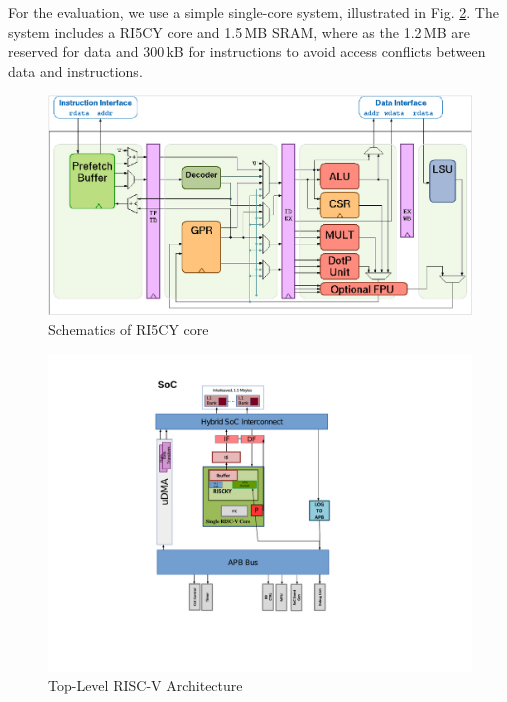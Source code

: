 For the evaluation, we use a simple single-core system, illustrated in Fig. \ref{fig:top-level}. The system includes a RI5CY core and 1.5\,MB SRAM, where as the 1.2\,MB are reserved for data and 300\,kB for instructions to avoid access conflicts between data and instructions.
\begin{figure}
    \centering
    \includegraphics[width=\textwidth]{figures/pipeline.png}
    \caption{Schematics of RI5CY core}
    \label{fig:pipelined}
\end{figure}
\begin{figure}
    \centering
    \includegraphics[trim={2.5cm 3.7cm 8.5cm 1.5cm},width=\textwidth]{figures/top-level_vega_simplified2.pdf}
    \caption{Top-Level RISC-V Architecture}
    \label{fig:top-level}
\end{figure}

